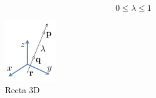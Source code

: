 \documentclass[main.tex]{subfiles}
\begin{document}
\begin{itemize}
\begin{itemize}
    \begin{equation}
      0\leq \lambda  \leq 1
    \end{equation}
    \begin{figure}[h]
      \centering
      \includegraphics[width=0.2\textwidth]{../img/recta_3d.jpg}
      \caption{Recta 3D}
      \label{recta3d}
    \end{figure}
  \end{itemize}
\end{itemize}
\end{document}
